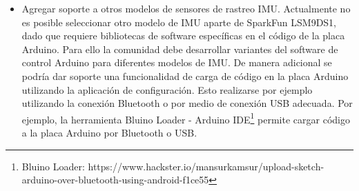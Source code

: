\begin{itemize}
	\item	 Agregar soporte a otros modelos de sensores de rastreo IMU. Actualmente no es posible seleccionar otro modelo de IMU aparte de SparkFun LSM9DS1, dado que requiere bibliotecas de software específicas en el código de la placa Arduino. Para ello la comunidad debe desarrollar variantes del software de control Arduino para diferentes modelos de IMU. De manera adicional se podría dar soporte una funcionalidad de carga de código en la placa Arduino utilizando la aplicación de configuración. Esto realizarse por ejemplo utilizando la conexión Bluetooth o por medio de conexión USB adecuada. Por ejemplo, la herramienta Bluino Loader - Arduino IDE\footnote{Bluino Loader: https://www.hackster.io/mansurkamsur/upload-sketch-arduino-over-bluetooth-using-android-f1ce55} permite cargar código a la placa Arduino por Bluetooth o USB.
	
\end{itemize}
